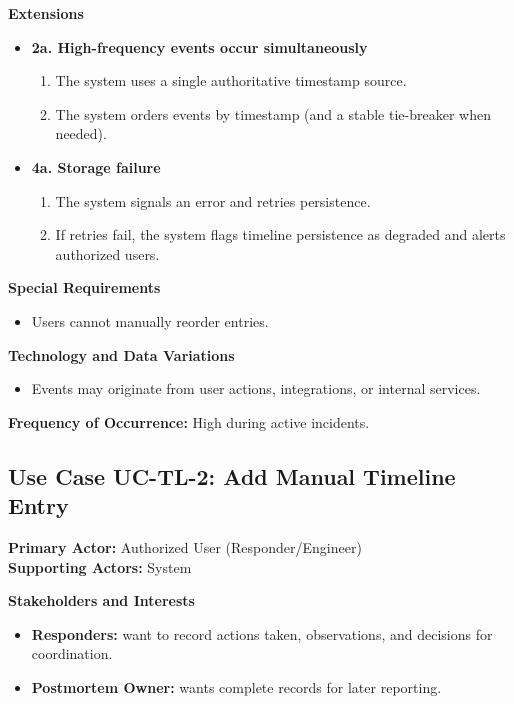 \documentclass[11pt]{article}
\begin{document}
\textbf{Extensions}
\begin{itemize}[nosep]
  \item \textbf{2a. High-frequency events occur simultaneously}
    \begin{enumerate}[nosep]
      \item The system uses a single authoritative timestamp source.
      \item The system orders events by timestamp (and a stable tie-breaker when needed).
    \end{enumerate}

  \item \textbf{4a. Storage failure}
    \begin{enumerate}[nosep]
      \item The system signals an error and retries persistence.
      \item If retries fail, the system flags timeline persistence as degraded and alerts authorized users.
    \end{enumerate}
\end{itemize}

\textbf{Special Requirements}
\begin{itemize}[nosep]
  \item Users cannot manually reorder entries.
\end{itemize}

\textbf{Technology and Data Variations}
\begin{itemize}[nosep]
  \item Events may originate from user actions, integrations, or internal services.
\end{itemize}

\textbf{Frequency of Occurrence:} High during active incidents.

\subsection*{Use Case UC-TL-2: Add Manual Timeline Entry}
\textbf{Primary Actor:} Authorized User (Responder/Engineer) \\
\textbf{Supporting Actors:} System

\textbf{Stakeholders and Interests}
\begin{itemize}[nosep]
  \item \textbf{Responders:} want to record actions taken, observations, and decisions for coordination.
  \item \textbf{Postmortem Owner:} wants complete records for later reporting.
\end{itemize}
\end{document}
